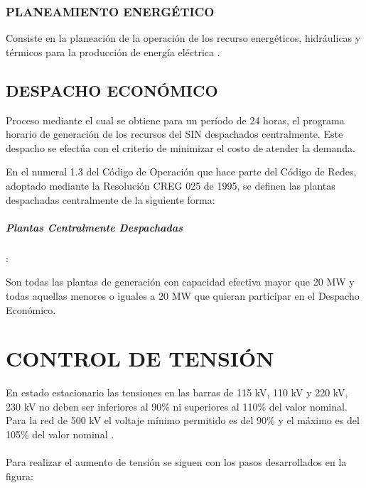 \documentclass[a5paper]{book}%
\begin{document}
\subsection{PLANEAMIENTO ENERGÉTICO}

Consiste en la planeación de la operación de los recurso energéticos,
hidráulicas y térmicos para la producción de energía eléctrica
\cite{CREG0251995}.

\section{DESPACHO ECONÓMICO}
Proceso mediante el cual se obtiene para un período de 24 horas, el programa horario de generación de los recursos del SIN despachados centralmente. Este despacho se efectúa con el criterio de minimizar el costo de atender la demanda.

En el numeral 1.3 del Código de Operación que hace parte del Código de Redes, adoptado mediante la Resolución CREG 025 de 1995, se definen las plantas despachadas centralmente de la siguiente forma:

\paragraph{Plantas Centralmente Despachadas}:

 Son todas las plantas de generación con capacidad efectiva mayor que 20 MW y todas aquellas menores o iguales a 20 MW que quieran participar en el Despacho Económico. 


\chapter{CONTROL DE TENSIÓN}

En estado estacionario las tensiones en las barras de 115 kV,
  110 kV y 220 kV, 230 kV no deben ser inferiores al 90\% ni
  superiores al 110\% del valor nominal. Para la red de 500 kV el
  voltaje mínimo permitido es del 90\% y el máximo es del 105\% del
  valor nominal \cite{CREG0251995}.\\\\

Para realizar el aumento de tensión se siguen con los pasos desarrollados en la figura:
\end{document}
